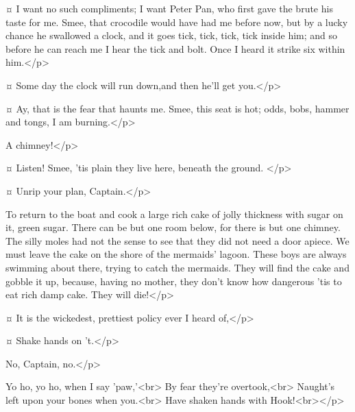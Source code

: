 \hookspeaks {}¤
I want no such compliments; I want Peter Pan, who first gave the brute his taste for me.
Smee, that crocodile would have had me before now, but by a lucky chance he swallowed a clock, and it goes tick, tick, tick, tick inside him; and so before he can reach me I hear the tick and bolt.
Once I heard it strike six within him.</p>

\smeespeaks {}¤
Some day the clock will run down,and then he'll get you.</p>

\hookspeaks {}¤
Ay, that is the fear that haunts me.
Smee, this seat is hot; odds, bobs, hammer and tongs, I am burning.</p>


\smeespeaks
A chimney!</p>

\hookspeaks {}¤
Listen!
Smee, 'tis plain they live here, beneath the ground.
</p>

\smeespeaks {}¤
Unrip your plan, Captain.</p>

\hookspeaks
To return to the boat and cook a large rich cake of jolly thickness with sugar on it, green sugar.
There can be but one room below, for there is but one chimney.
The silly moles had not the sense to see that they did not need a door apiece.
We must leave the cake on the shore of the mermaids' lagoon.
These boys are always swimming about there, trying to catch the mermaids.
They will find the cake and gobble it up, because, having no mother, they don't know how dangerous 'tis to eat rich damp cake.
They will die!</p>

\smeespeaks {}¤
It is the wickedest, prettiest policy ever I heard of,</p>

\hookspeaks {}¤
Shake hands on 't.</p>

\smeespeaks
No, Captain, no.</p>


\hookspeaks
Yo ho, yo ho, when I say 'paw,'<br> By fear they're overtook,<br> Naught's left upon your bones when you.<br> Have shaken hands with Hook!<br></p>

